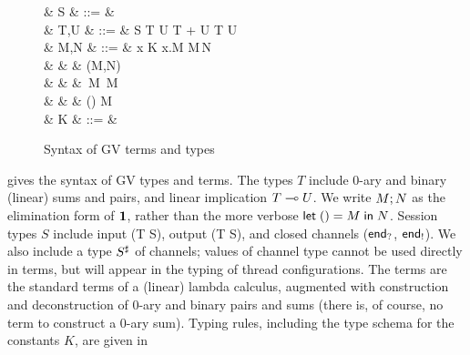 \documentclass[orivec,envcountsame]{llncs}
\begin{document}
\begin{figure}[t]
\begin{syntax}
   & S & ::= &  \mid {} \mid \interm \mid \outterm \mid {} \\
   & T,U & ::= & S \mid T \times U \mid \one \mid T + U \mid \zero \mid T \lto U \\ %
   & M,N & ::= & x \mid K \mid \lambda x.M \mid M\,N \\
  & & \mid & (M,N) \mid {} \\
  & & \mid & \,M \mid {}\,M \mid {} \\
  & & \mid & () \mid {} \mid {} \app M \\
   & K & ::= &  \mid {} \mid {} \mid {} \mid {}\\
\end{syntax}
\caption{Syntax of GV terms and types}\label{fig:gv-syntax}
\end{figure}

 gives the syntax of GV types and terms.  The types $T$ include 0-ary and binary
(linear) sums and pairs, and linear implication $T \multimap U$.  We write $M; N$ as the
elimination form of $\mathbf{1}$, rather than the more verbose $\mathsf{let}\;() = M\;\mathsf{in}\;N$.  Session types $S$
include input (\gvin T S), output (\gvout T S), and closed channels ($\mathsf{end}_?$, $\mathsf{end}_!$).  We
also include a type $S^\sharp$ of channels; values of channel type cannot be used directly in
terms, but will appear in the typing of thread configurations.  The terms are the standard terms of
a (linear) lambda calculus, augmented with construction and deconstruction of 0-ary and binary pairs
and sums (there is, of course, no term to construct a 0-ary sum).  Typing rules, including the type schema for the constants $K$, are given in
\end{document}

